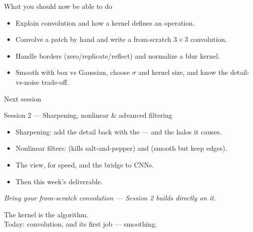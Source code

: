 \documentclass[10pt,aspectratio=169]{beamer}
\begin{document}
\begin{frame}{What you should now be able to do}
  \begin{itemize}
    \item Explain convolution and how a kernel defines an operation.
    \item Convolve a patch by hand and write a from-scratch $3\times3$ convolution.
    \item Handle borders (zero/replicate/reflect) and normalize a blur kernel.
    \item Smooth with box vs Gaussian, choose $\sigma$ and kernel size, and know the detail-vs-noise trade-off.
  \end{itemize}
\end{frame}

\begin{frame}{Next session}
  \begin{alertblock}{Session 2 — Sharpening, nonlinear \& advanced filtering}
    \begin{itemize}
      \item Sharpening: add the detail back with the  — and the halos it causes.
      \item Nonlinear filters:  (kills salt-and-pepper) and  (smooth but keep edges).
      \item The  view,  for speed, and the bridge to CNNs.
      \item Then this week's deliverable.
    \end{itemize}
  \end{alertblock}
  \begin{center}\itshape Bring your from-scratch convolution — Session 2 builds directly on it.\end{center}
\end{frame}

\begin{frame}[standout]
  The kernel is the algorithm.\\[4pt]
  \normalsize Today: convolution, and its first job — smoothing.
\end{frame}
\end{document}
